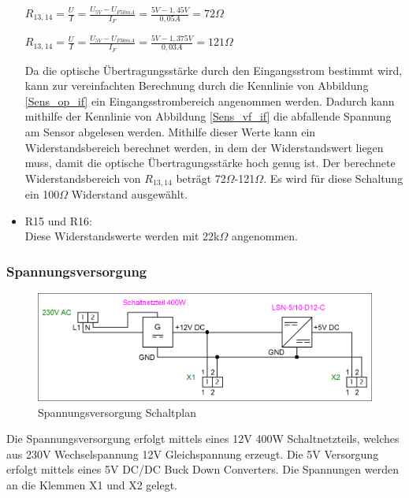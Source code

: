 \begin{itemize}
\begin{center}
$R_{13,14}=\frac{U}{I}=\frac{U_{5V}-U_{F 50mA}}{I_{F}}=\frac{5V-1,45V}{0,05A}=72\Omega$
\end{center}
\begin{center}
$R_{13,14}=\frac{U}{I}=\frac{U_{5V}-U_{F 30mA}}{I_{F}}=\frac{5V-1,375V}{0,03A}=121\Omega$
\end{center}
Da die optische Übertragungsstärke durch den Eingangsstrom bestimmt wird, kann zur vereinfachten Berechnung durch die Kennlinie von Abbildung \ref{Sens_op_if} ein Eingangsstrombereich angenommen werden. Dadurch kann mithilfe der Kennlinie von Abbildung \ref{Sens_vf_if} die abfallende Spannung am Sensor abgelesen werden. Mithilfe dieser Werte kann ein Widerstandsbereich berechnet werden, in dem der Widerstandswert liegen muss, damit die optische Übertragungsstärke  hoch genug ist. Der berechnete Widerstandsbereich von $R_{13,14}$ beträgt 72$\Omega$-121$\Omega$. Es wird für diese Schaltung ein 100$\Omega$ Widerstand ausgewählt.
\item R15 und R16:\\
Diese Widerstandswerte werden mit 22k$\Omega$ angenommen.
\end{itemize}
\subsubsection{Spannungsversorgung}
\begin{figure}[H] 
\begin{center}

\includegraphics[width=15cm]{Bilder/Schaltplan/Spannungsversorgungen}
\caption{Spannungsversorgung Schaltplan}
\label{Spannungsversorgung}

\end{center}
\end{figure}
Die Spannungsversorgung erfolgt mittels eines 12V 400W Schaltnetzteils, welches aus 230V Wechselspannung 12V Gleichspannung erzeugt. Die 5V Versorgung erfolgt mittels eines 5V DC/DC Buck Down Converters.
Die Spannungen werden an die Klemmen X1 und X2 gelegt.

